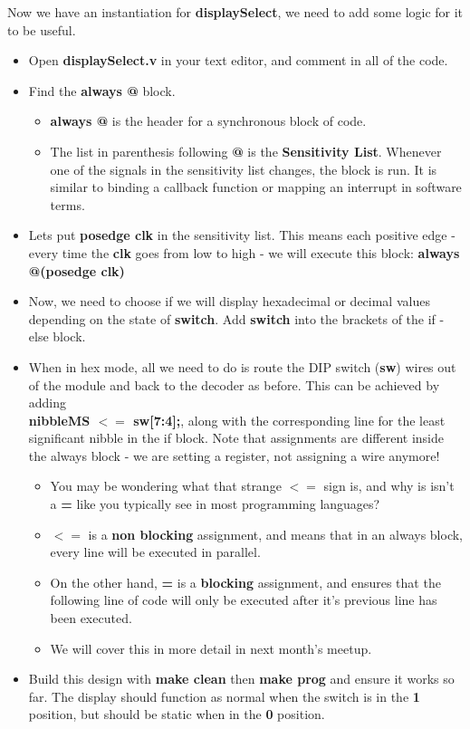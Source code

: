 \documentclass[12pt,a4paper]{article}
\begin{document}
\noindent
Now we have an instantiation for \textbf{displaySelect}, we need to add some logic for it to be useful.
\begin{itemize}
	\item Open \textbf{displaySelect.v} in your text editor, and comment in all of the code. 
	\item Find the \textbf{always @} block.
	\begin{itemize}
		\item \textbf{always @} is the header for a synchronous block of code.
		\item The list in parenthesis following \textbf{@} is the \textbf{Sensitivity List}. Whenever one of the signals in the sensitivity list changes, the block is run. It is similar to binding a callback function or mapping an interrupt in software terms. 
	\end{itemize} 
		\item Lets put \textbf{posedge clk} in the sensitivity list. This means each positive edge - every time the \textbf{clk} goes from low to high - we will execute this block: \textbf{always @(posedge clk)}
		\item Now, we need to choose if we will display hexadecimal or decimal values depending on the state of \textbf{switch}. Add \textbf{switch} into the brackets of the if - else block. 
		\item When in hex mode, all we need to do is route the DIP switch (\textbf{sw}) wires out of the module and back to the decoder as before. This can be achieved by adding \\ \textbf{nibbleMS $<=$ sw[7:4];}, along with the corresponding line for the least significant nibble in the if block. Note that assignments are different inside the always block - we are setting a register, not assigning a wire anymore! 
		\begin{itemize}
			\item You may be wondering what that strange \textbf{$<=$} sign is, and why is isn't a \textbf{=} like you typically see in most programming languages?
			\item \textbf{$<=$} is a \textbf{non blocking} assignment, and means that in an always block, every line will be executed in parallel. 
			\item On the other hand, \textbf{=} is a \textbf{blocking} assignment, and ensures that the following line of code will only be executed after it's previous line has been executed. 
			\item We will cover this in more detail in next month's meetup.
		\end{itemize}
		\item Build this design with \textbf{make clean} then \textbf{make prog} and ensure it works so far. The display should function as normal when the switch is in the \textbf{1} position, but should be static when in the \textbf{0} position. 
	\end{itemize}
\end{document}
